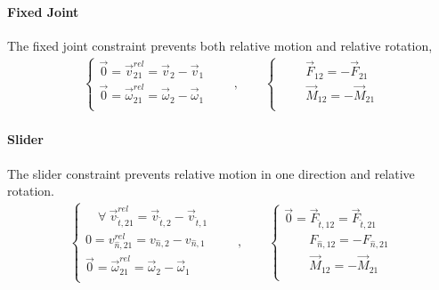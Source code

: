 \documentclass[letterpaper,10pt,english]{jupyterBook}
\begin{document}
\paragraph{Fixed Joint}
\label{\detokenize{ch/actions-reactions:fixed-joint}}
\sphinxAtStartPar
The fixed joint constraint prevents both relative motion and relative rotation,
\begin{equation*}
\begin{split}
\begin{cases}
  \vec{0} = \vec{v}^{rel}_{21}     = \vec{v}_{2}     - \vec{v}_{1} \\
  \vec{0} = \vec{\omega}^{rel}_{21} = \vec{\omega}_{2} - \vec{\omega}_{1} \\
\end{cases}
\qquad , \qquad
\begin{cases}
  \qquad \vec{F}_{12} = - \vec{F}_{21} \\
  \qquad \vec{M}_{12} = - \vec{M}_{21} \\
\end{cases}
\end{split}
\end{equation*}

\paragraph{Slider}
\label{\detokenize{ch/actions-reactions:slider}}
\sphinxAtStartPar
The slider constraint prevents relative motion in one direction and relative rotation.
\begin{equation*}
\begin{split}
\begin{cases}
  \quad \forall \ \vec{v}^{rel}_{\hat{t},21}     = \vec{v}_{\hat{t},2}     - \vec{v}_{\hat{t},1} \\
          0  = v^{rel}_{\hat{n},21}     = v_{\hat{n},2}     - v_{\hat{n},1} \\
  \vec{0} = \vec{\omega}^{rel}_{21} = \vec{\omega}_{2} - \vec{\omega}_{1} \\
\end{cases}
\qquad , \qquad
\begin{cases}
  \vec{0} = \vec{F}_{\hat{t},12} = \vec{F}_{\hat{t},21} \\
  \qquad F_{\hat{n},12} = - F_{\hat{n},21} \\
  \qquad \vec{M}_{12} = - \vec{M}_{21} \\
\end{cases}
\end{split}
\end{equation*}
\end{document}
